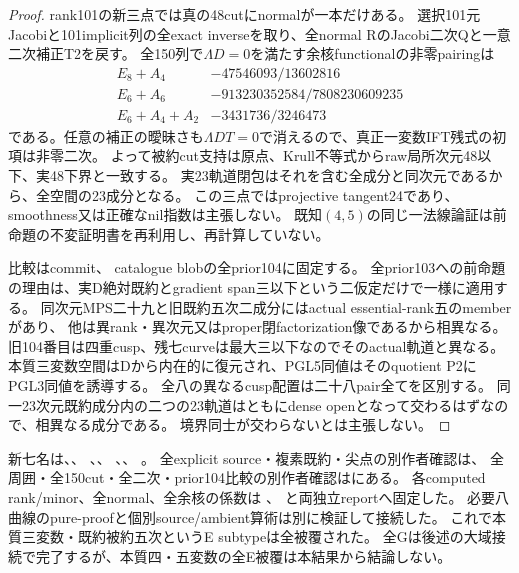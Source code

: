 \documentclass[a4paper,11pt]{ltjsarticle}
\theoremstyle{definition}
\begin{document}
\begin{proof}
rank101の新三点では真の48cutにnormalが一本だけある。
選択101元Jacobiと101implicit列の全exact inverseを取り、全normal RのJacobi二次Qと一意二次補正T2を戻す。
全150列で$\Lambda D=0$を満たす余核functionalの非零pairingは
\[
\begin{array}{c|c}
 E_8+A_4&-47546093/13602816\\
 E_6+A_6&-913230352584/7808230609235\\
 E_6+A_4+A_2&-3431736/3246473
\end{array}
\]
である。任意の補正の曖昧さも$\Lambda DT=0$で消えるので、真正一変数IFT残式の初項は非零二次。
よって被約cut支持は原点、Krull不等式からraw局所次元48以下、実48下界と一致する。
実23軌道閉包はそれを含む全成分と同次元であるから、全空間の23成分となる。
この三点ではprojective tangent24であり、smoothness又は正確なnil指数は主張しない。
既知$(4,5)$の同じ一法線論証は前命題の不変証明書を再利用し、再計算していない。

比較はcommit、
catalogue blobの全prior104に固定する。
全prior103への前命題の理由は、実D絶対既約とgradient span三以下という二仮定だけで一様に適用する。
同次元MPS二十九と旧既約五次二成分にはactual essential-rank五のmemberがあり、
他は異rank・異次元又はproper閉factorization像であるから相異なる。
旧104番目は四重cusp、残七curveは最大三以下なのでそのactual軌道と異なる。
本質三変数空間はDから内在的に復元され、PGL5同値はそのquotient P2にPGL3同値を誘導する。
全八の異なるcusp配置は二十八pair全てを区別する。
同一23次元既約成分内の二つの23軌道はともにdense openとなって交わるはずなので、相異なる成分である。
境界同士が交わらないとは主張しない。
\end{proof}
新七名は、、
、、
、、
。
全explicit source・複素既約・尖点の別作者確認は、
全周囲・全150cut・全二次・prior104比較の別作者確認はにある。
各computed rank/minor、全normal、全余核の係数は
、
と両独立reportへ固定した。
必要八曲線のpure-proofと個別source/ambient算術は別に検証して接続した。
これで本質三変数・既約被約五次というE subtypeは全被覆された。
全Gは後述の大域接続で完了するが、本質四・五変数の全E被覆は本結果から結論しない。
\end{document}
